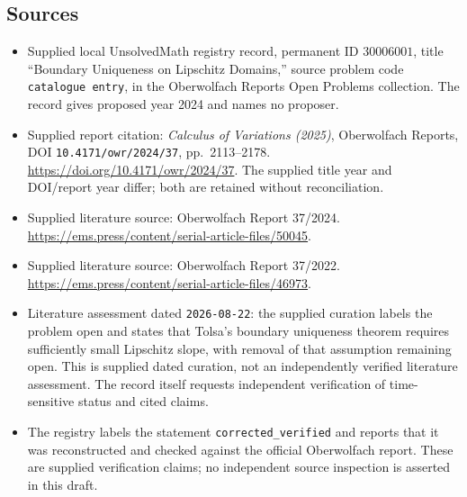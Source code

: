 \documentclass[11pt]{article}
\begin{document}
\subsection{Sources}
\begin{itemize}
\item Supplied local UnsolvedMath registry record, permanent ID \(30006001\), title ``Boundary Uniqueness on Lipschitz Domains,'' source problem code \texttt{catalogue entry}, in the Oberwolfach Reports Open Problems collection. The record gives proposed year 2024 and names no proposer.
\item Supplied report citation: \emph{Calculus of Variations (2025)}, Oberwolfach Reports, DOI \texttt{10.4171/owr/2024/37}, pp.\ 2113--2178. \url{https://doi.org/10.4171/owr/2024/37}. The supplied title year and DOI/report year differ; both are retained without reconciliation.
\item Supplied literature source: Oberwolfach Report 37/2024. \url{https://ems.press/content/serial-article-files/50045}.
\item Supplied literature source: Oberwolfach Report 37/2022. \url{https://ems.press/content/serial-article-files/46973}.
\item Literature assessment dated \texttt{2026-08-22}: the supplied curation labels the problem open and states that Tolsa's boundary uniqueness theorem requires sufficiently small Lipschitz slope, with removal of that assumption remaining open. This is supplied dated curation, not an independently verified literature assessment. The record itself requests independent verification of time-sensitive status and cited claims.
\item The registry labels the statement \texttt{corrected\_verified} and reports that it was reconstructed and checked against the official Oberwolfach report. These are supplied verification claims; no independent source inspection is asserted in this draft.
\end{itemize}
\end{document}
